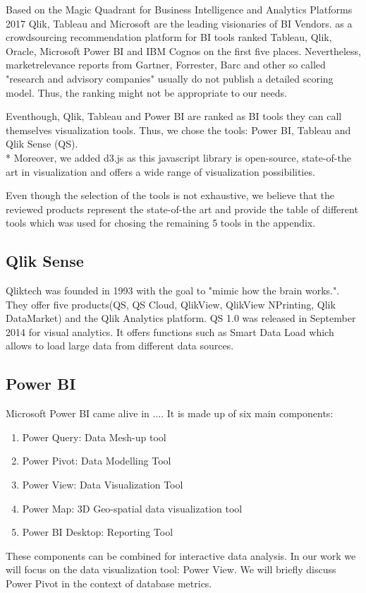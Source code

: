 Based on the Magic Quadrant for Business Intelligence and Analytics Platforms 2017 \cite{Sallam2017} Qlik, Tableau and Microsoft are the leading visionaries of BI Vendors. \cite{ITCentralStation} as a crowdsourcing recommendation platform for BI tools ranked Tableau, Qlik, Oracle, Microsoft Power BI and IBM Cognos on the first five places. Nevertheless, marketrelevance reports from Gartner, Forrester, Barc and other so called "research and advisory companies" usually do not publish a detailed scoring model. Thus, the ranking might not be appropriate to our needs.

Eventhough, Qlik, Tableau and Power BI are ranked as BI tools they can call themselves visualization tools. 
Thus, we chose the tools: Power BI, Tableau and Qlik Sense (QS).\\*
Moreover, we added d3.js as this javascript library is open-source, state-of-the art in visualization and offers a wide range of visualization possibilities.

Even though the selection of the tools is not exhaustive, we believe that the reviewed products represent the state-of-the art and provide the table of different tools which was used for chosing the remaining 5 tools in the appendix.

\subsection*{Qlik Sense}
Qliktech was founded in 1993 with the goal to "mimic how the brain works."\cite{qlikHistory}. They offer five products(QS, QS Cloud, QlikView, QlikView NPrinting, Qlik DataMarket) and the Qlik Analytics platform. QS 1.0 was released in September 2014 for visual analytics. 
It offers functions such as Smart Data Load which allows to load large data from different data sources.

\subsection*{Power BI}
Microsoft Power BI came alive in .... It is made up of six main components: 
\begin{enumerate}
    \item Power Query: Data Mesh-up tool
    \item Power Pivot: Data Modelling Tool
    \item Power View: Data Visualization Tool
    \item Power Map: 3D Geo-spatial data visualization tool
    \item Power BI Desktop: Reporting Tool 
\end{enumerate}
These components can be combined for interactive data analysis. In our work we will focus on the data visualization tool: Power View. We will briefly discuss Power Pivot in the context of database metrics. 


